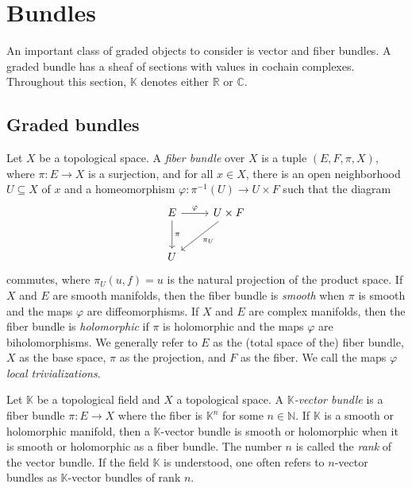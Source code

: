 \chapter{Bundles}

An important class of graded objects to consider is vector and fiber bundles. A graded bundle has a sheaf of sections with values in cochain complexes. Throughout this section, $\mathbb{K} $ denotes either $\mathbb{R} $ or $\mathbb{C} $.

\section{Graded bundles}

\begin{definition}\label{dfn:4.1.1}
	Let $X$ be a topological space. A \emph{fiber bundle} over $X$ is a tuple $(E,F,\pi ,X)$, where $\pi : E \to X$ is a surjection, and for all $x\in X$, there is an open neighborhood $U\subseteq X$ of $x$ and a homeomorphism $\varphi : \pi ^{-1} (U) \to U\times F$ such that the diagram
	\[\begin{tikzcd}[row sep = 2.5em, column sep = 2.5em]
	E \ar[" \varphi  ", r]\ar[" \pi  ", d]   & U\times F \ar[" \pi_U ", dl]  \\
	U & 
	\end{tikzcd}\]
	commutes, where $\pi _U(u,f)=u$ is the natural projection of the product space. If $X$ and $E$ are smooth manifolds, then the fiber bundle is \emph{smooth} when $\pi $ is smooth and the maps $\varphi $ are diffeomorphisms. If $X$ and $E$ are complex manifolds, then the fiber bundle is \emph{holomorphic} if $\pi $ is holomorphic and the maps $\varphi $ are biholomorphisms. We generally refer to $E$ as the (total space of the) fiber bundle, $X$ as the base space, $\pi $ as the projection, and $F$ as the fiber. We call the maps $\varphi $ \emph{local trivializations}.
\end{definition}
\begin{definition}\label{dfn:4.1.2}
	Let $\mathbb{K} $ be a topological field and $X$ a topological space. A \emph{$\mathbb{K} $-vector bundle} is a fiber bundle $\pi : E \to X$ where the fiber is $\mathbb{K}^n$ for some $n\in\mathbb{N} $. If $\mathbb{K} $ is a smooth or holomorphic manifold, then a $\mathbb{K} $-vector bundle is smooth or holomorphic when it is smooth or holomorphic as a fiber bundle. The number $n$ is called the \emph{rank} of the vector bundle. If the field $\mathbb{K} $ is understood, one often refers to $n$-vector bundles as $\mathbb{K} $-vector bundles of rank $n$.
\end{definition}

